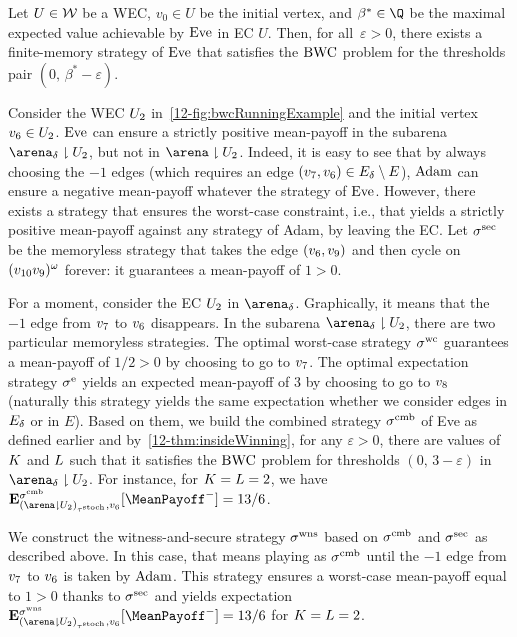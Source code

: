 \begin{theorem}
\label{12-thm:wns}
Let $U \in \mathcal{W}$ be a WEC, $v_0 \in U$ be the initial vertex, and $\beta^\ast \in \Q$ be the maximal expected value achievable by $\text{Eve}$ in EC $U$. Then, for all~$\varepsilon > 0$, there exists a finite-memory strategy of $\text{Eve}$ that satisfies the $\text{BWC}$ problem for the thresholds pair $(0,\, \beta^\ast - \varepsilon)$.
\end{theorem}

\begin{example}
Consider the WEC $U_{2}$ in~\cref{12-fig:bwcRunningExample} and the initial vertex $v_{6} \in U_{2}$. $\text{Eve}$ can ensure a strictly positive mean-payoff in the subarena $\gameNonZero \reduc \ec_{2}$, but not in $\arena \reduc \ec_{2}$. Indeed, it is easy to see that by always choosing the $-1$ edges (which requires an edge $(v_{7}, v_{6}) \in E_{\delta} \setminus E$), $\text{Adam}$ can ensure a negative mean-payoff whatever the strategy of $\text{Eve}$. However, there exists a strategy that ensures the worst-case constraint, i.e., that yields a strictly positive mean-payoff against any strategy of Adam, by leaving the EC. Let $\sigma^{\text{sec}}$ be the memoryless strategy that takes the edge $(v_{6}, v_{9})$ and then cycle on $(v_{10}v_{9})^{\omega}$ forever: it guarantees a mean-payoff of $1 > 0$.

For a moment, consider the EC $U_{2}$ in $\gameNonZero$. Graphically, it means that the $-1$ edge from $v_{7}$ to $v_{6}$ disappears. In the subarena $\gameNonZero \reduc \ec_{2}$, there are two particular memoryless strategies. The optimal worst-case strategy $\sigma^{\text{wc}}$ guarantees a mean-payoff of $1/2 > 0$ by choosing to go to $v_{7}$. The optimal expectation strategy $\sigma^{\text{e}}$ yields an expected mean-payoff of $3$ by choosing to go to $v_{8}$ (naturally this strategy yields the same expectation whether we consider edges in $E_{\delta}$ or in $E$). Based on them, we build the combined strategy $\sigma^{\text{cmb}}$ of Eve as defined earlier and by~\cref{12-thm:insideWinning}, for any $\varepsilon > 0$, there are values of $K$ and $L$ such that it satisfies the $\text{BWC}$ problem for thresholds $(0,\, 3-\varepsilon)$ in $\gameNonZero \reduc \ec_{2}$. For instance, for $K = L = 2$, we have $\expv^{\stratComb}_{(\arena \reduc \ec_{2})_{\tau^\text{stoch}},v_{6}}[\MeanPayoff^{-}] = 13/6$.

We construct the witness-and-secure strategy $\sigma^{\text{wns}}$ based on $\sigma^{\text{cmb}}$ and $\sigma^{\text{sec}}$ as described above. In this case, that means playing as $\sigma^{\text{cmb}}$ until the $-1$ edge from $v_{7}$ to $v_{6}$ is taken by $\text{Adam}$. This strategy ensures a worst-case mean-payoff equal to $1 > 0$ thanks to $\sigma^{\text{sec}}$ and yields expectation $\expv^{\stratWNS}_{(\arena \reduc \ec_{2})_{\tau^\text{stoch}},v_{6}}[\MeanPayoff^{-}] = 13/6$ for $K = L = 2$.


\end{example}
